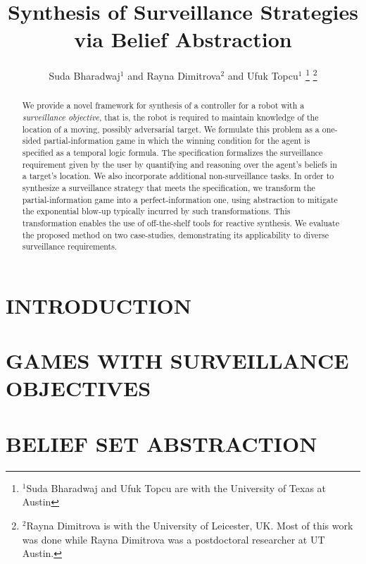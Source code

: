 \documentclass[letterpaper, 10 pt, conference]{ieeeconf}  %
\title{\LARGE \bf Synthesis of Surveillance Strategies via Belief Abstraction}
\author{Suda Bharadwaj$^{1}$ and Rayna Dimitrova$^{2}$ and Ufuk Topcu$^{1}$%
\thanks{$^{1}$Suda Bharadwaj and Ufuk Topcu are with the University of Texas at Austin}%
\thanks{$^{2}$Rayna Dimitrova is with the University of Leicester, UK. Most of this work was done while Rayna Dimitrova was a postdoctoral researcher at UT Austin.}%
}
\begin{document}
\maketitle
\thispagestyle{empty}
\pagestyle{empty}


\begin{abstract}

We provide a novel framework for synthesis of a controller for a robot with a \emph{surveillance objective}, that is, the robot is required to  maintain knowledge of the location of a moving, possibly adversarial target. We formulate this problem as a one-sided partial-information  game in which the winning condition for the agent is specified as a temporal logic formula. The specification formalizes the surveillance requirement given by the user by quantifying and reasoning over the agent's beliefs in a target's location. We also incorporate additional non-surveillance tasks. In order to synthesize a surveillance strategy that meets the specification, we transform the partial-information game into a perfect-information one, using abstraction to mitigate the exponential blow-up typically incurred by such transformations. This transformation enables the use of off-the-shelf tools for reactive synthesis. We evaluate the proposed method on two case-studies, demonstrating its applicability to diverse surveillance requirements.
\end{abstract}


\section{INTRODUCTION}




\section{GAMES WITH SURVEILLANCE OBJECTIVES}



\section{BELIEF SET ABSTRACTION}

\end{document}
